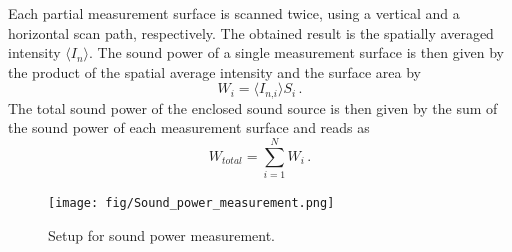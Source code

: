 Each partial measurement surface is scanned twice, using a vertical and a horizontal scan path, respectively. The obtained result is the spatially averaged intensity $\langle I_{n}\rangle$. The sound power of a single measurement surface is then given by the product of the spatial average intensity and the surface area by
\begin{equation}
    W_i = \langle I_{n\text{,}i}\rangle S_i\,.
\end{equation}
The total sound power of the enclosed sound source is then given by the sum of the sound power of each measurement surface and reads as
\begin{equation}
    W_{total} = \sum_{i = 1}^{N} W_i\,.
\end{equation}

\begin{figure}[H]
\begin{center}
\texttt{[image: fig/Sound\_power\_measurement.png]}
\caption{Setup for sound power measurement.}
\label{fig:soundpowersetup}
\end{center}
\end{figure}

